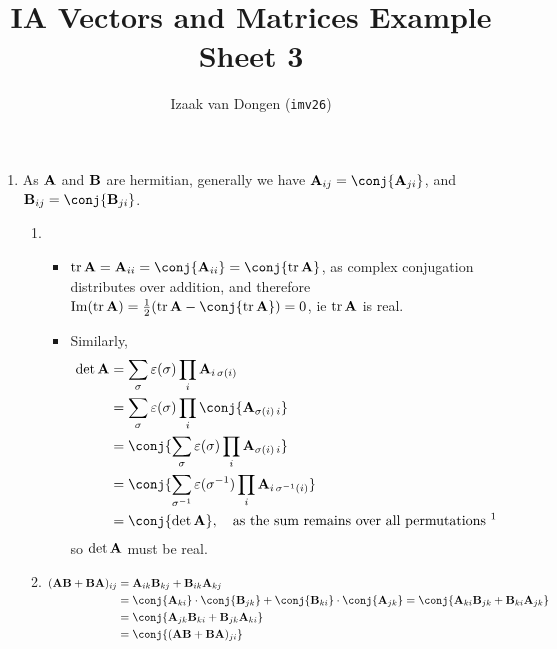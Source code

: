 \documentclass[fleqn,a4paper,11pt]{article}
\title{IA Vectors and Matrices Example Sheet 3}
\author{Izaak van Dongen (\texttt{imv26})}
\begin{document}
 \maketitle\thispagestyle{empty} %

 \begin{enumerate}[label=\textbf{\arabic*.}]
  \item
   As \(\mathbf{A}\) and \(\mathbf{B}\) are hermitian, generally we have
   \(\mat A_{ij} = \conj{\mat A_{ji}}\), and
   \(\mat B_{ij} = \conj{\mat B_{ji}}\).
   \begin{enumerate}[label=(\roman*)]
    \item
     \begin{itemize}
      \item
       \(\tr \mat A = \mat A_{ii} = \conj{\mat A_{ii}} = \conj{\tr \mat A}\), as
       complex conjugation distributes over addition, and therefore
       \(\Im(\tr \mat A) = \tfrac 12 (\tr \mat A - \conj{\tr \mat A}) = 0\), ie
       \(\operatorname{tr} \mathbf{A}\) is real.
      \item
       Similarly,
       \begin{align*}
        \det \mat A
         &= \sum_\sigma \epsilon(\sigma) \prod_i \mat A_{i\,\sigma(i)} \\
         &= \sum_\sigma \epsilon(\sigma) \prod_i \conj{\mat A_{\sigma(i)\,i}} \\
         &= \conj{\sum_\sigma \epsilon(\sigma) \prod_i \mat A_{\sigma(i)\,i}} \\
         &= \conj{\sum_{\sigma^{-1}} \epsilon(\sigma^{-1})
                 \prod_i \mat A_{i\,\sigma^{-1}(i)}} \\
         &= \conj{\det \mat A},\quad
         \text{as the sum remains over all permutations \footnotemark}
       \end{align*}
       so \(\det \mathbf{A}\) must be real.
     \end{itemize}
    \item \(
     \begin{aligned}[t]
     (\mat A\mat B + \mat B\mat A)_{ij}
       &= \mat A_{ik}\mat B_{kj} + \mat B_{ik}\mat A_{kj} \\
       &= \conj{\mat A_{ki}} \cdot \conj{\mat B_{jk}}
          + \conj{\mat B_{ki}} \cdot \conj{\mat A_{jk}}
       = \conj{\mat A_{ki}\mat B_{jk} + \mat B_{ki}\mat A_{jk}} \\
       &= \conj{\mat A_{jk}\mat B_{ki} + \mat B_{jk}\mat A_{ki}} \\
       &= \conj{(\mat A\mat B + \mat B\mat A)_{ji}}
     \end{aligned}\)


\end{enumerate}
\end{enumerate}
\end{document}

